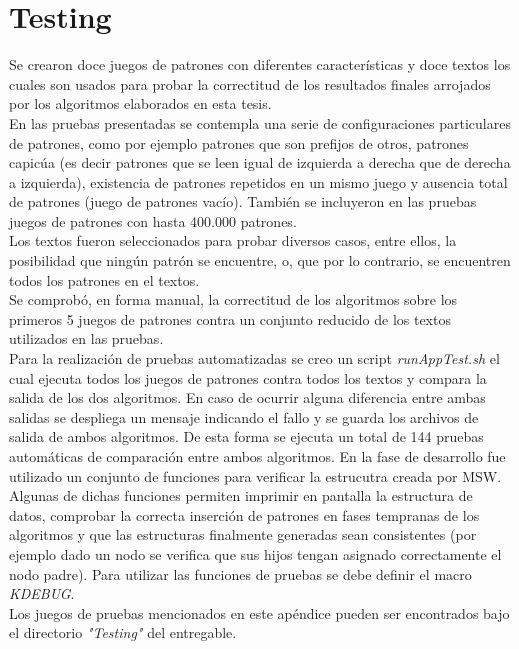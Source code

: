 
\chapter{Testing} %

\label{AppendixC} %


Se crearon doce juegos de patrones con diferentes características y doce textos los cuales son usados para probar la correctitud de los resultados finales arrojados por los algoritmos elaborados en esta tesis.\\
En las pruebas presentadas se contempla una serie de configuraciones particulares de patrones, como por ejemplo patrones que son prefijos de otros, patrones capicúa (es decir patrones que se leen igual de izquierda a derecha que de derecha a izquierda), existencia de patrones repetidos en un mismo juego y ausencia total de patrones (juego de patrones vacío). También se incluyeron en las pruebas juegos de patrones con hasta 400.000 patrones.\\ 
Los textos fueron seleccionados para probar diversos casos, entre ellos, la posibilidad que ningún patrón se encuentre, o, que por lo contrario, se encuentren todos los patrones en el textos.\\ Se comprobó, en forma manual, la correctitud de los algoritmos sobre los primeros 5 juegos de patrones contra un conjunto reducido de los textos utilizados en las pruebas.\\ Para la realización de pruebas automatizadas se creo un script {\it runAppTest.sh} el cual ejecuta todos los juegos de patrones contra todos los textos y compara la salida de los dos algoritmos. En caso de ocurrir alguna diferencia entre ambas salidas se despliega un mensaje indicando el fallo y se guarda los archivos de salida de ambos algoritmos. De esta forma se ejecuta un total de 144 pruebas automáticas de comparación entre ambos algoritmos. En la fase de desarrollo fue utilizado un conjunto de funciones para verificar la estrucutra creada por MSW. Algunas de dichas funciones permiten imprimir en pantalla la estructura de datos, comprobar la correcta inserción de patrones en fases tempranas de los algoritmos y que las estructuras finalmente generadas sean consistentes (por ejemplo dado un nodo se verifica que sus hijos tengan asignado correctamente el nodo padre). Para utilizar las funciones de pruebas se debe definir el macro {\it KDEBUG}.\\ Los juegos de pruebas mencionados en este apéndice pueden ser encontrados bajo el directorio {\it"Testing"} del entregable.